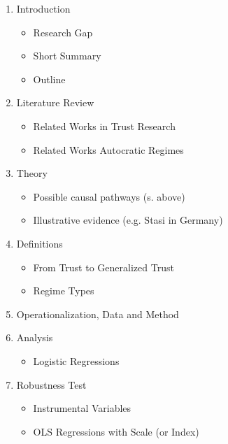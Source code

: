 \begin{enumerate}
\item Introduction

\begin{itemize}
\item Research Gap
\item Short Summary
\item Outline
\end{itemize}

\item Literature Review
\begin{itemize}
\item Related Works in Trust Research
\item Related Works Autocratic Regimes
\end{itemize}

\item Theory
\begin{itemize}
\item Possible causal pathways (s. above)
\item Illustrative evidence (e.g. Stasi in Germany)
\end{itemize}

\item Definitions
\begin{itemize}
\item From Trust to Generalized Trust
\item Regime Types
\end{itemize}

\item Operationalization, Data and Method

\item Analysis
\begin{itemize}
\item Logistic Regressions
\end{itemize}

\item Robustness Test
\begin{itemize}
\item Instrumental Variables
\item OLS Regressions with Scale (or Index)
\end{itemize}
\end{enumerate}







